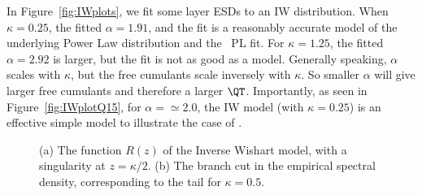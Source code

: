 In Figure~\ref{fig:IWplots}, we fit some \Typical layer ESDs to an IW distribution.
When $\kappa=0.25$, the fitted $\alpha=1.91$, and the fit is a reasonably accurate model of the underlying Power Law
distribution and the ~\WW PL fit.
For  $\kappa=1.25$, the fitted $\alpha=2.92$ is larger, but the fit is not as good as a
model. Generally speaking, $\alpha$ scales with $\kappa$, but the  free cumulants scale inversely with $\kappa$.
So smaller $\alpha$ will give larger free cumulants and therefore a larger $\QT$.
Importantly, as seen in Figure~\ref{fig:IWplotQ15}, for $\alpha=\simeq 2.0$, the IW model (with $\kappa=0.25$)
is an effective simple model to illustrate the \SETOL case of \IdealLearning.

\begin{figure}[t]
    \centering
    \caption{(a) The function $R(z)$ of the Inverse Wishart model, with a singularity at $z = \kappa/2$. (b) The branch cut in the empirical spectral density, corresponding to the tail for $\kappa = 0.5$.}
    \label{fig:R_branch_cut_combined}
\end{figure}

